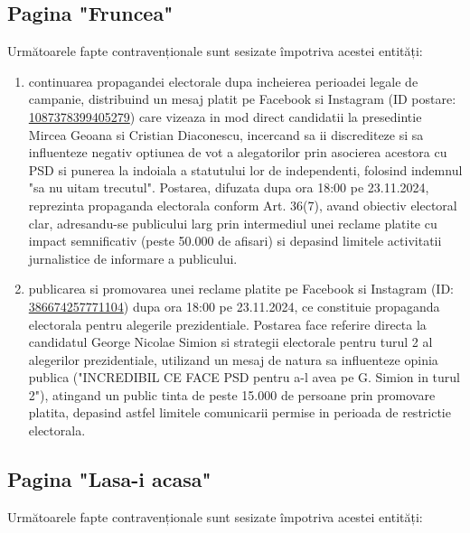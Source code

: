 \documentclass[a4paper,12pt]{article}
\begin{document}
\vspace{0.5cm}

\subsection{Pagina "Fruncea"}
Următoarele fapte contravenționale sunt sesizate împotriva acestei entități:

\begin{enumerate}[leftmargin=*, label=\arabic*.)]
    \item continuarea propagandei electorale dupa incheierea perioadei legale de campanie, distribuind un mesaj platit pe Facebook si Instagram (ID postare: \href{https://www.facebook.com/ads/library/?id=1087378399405279}{1087378399405279}) care vizeaza in mod direct candidatii la presedintie Mircea Geoana si Cristian Diaconescu, incercand sa ii discrediteze si sa influenteze negativ optiunea de vot a alegatorilor prin asocierea acestora cu PSD si punerea la indoiala a statutului lor de independenti, folosind indemnul "sa nu uitam trecutul". Postarea, difuzata dupa ora 18:00 pe 23.11.2024, reprezinta propaganda electorala conform Art. 36(7), avand obiectiv electoral clar, adresandu-se publicului larg prin intermediul unei reclame platite cu impact semnificativ (peste 50.000 de afisari) si depasind limitele activitatii jurnalistice de informare a publicului.
    \item publicarea si promovarea unei reclame platite pe Facebook si Instagram (ID: \href{https://www.facebook.com/ads/library/?id=386674257771104}{386674257771104}) dupa ora 18:00 pe 23.11.2024, ce constituie propaganda electorala pentru alegerile prezidentiale. Postarea face referire directa la candidatul George Nicolae Simion si strategii electorale pentru turul 2 al alegerilor prezidentiale, utilizand un mesaj de natura sa influenteze opinia publica ("INCREDIBIL CE FACE PSD pentru a-l avea pe G. Simion in turul 2"), atingand un public tinta de peste 15.000 de persoane prin promovare platita, depasind astfel limitele comunicarii permise in perioada de restrictie electorala.
\end{enumerate}

\vspace{0.5cm}

\subsection{Pagina "Lasa-i acasa"}
Următoarele fapte contravenționale sunt sesizate împotriva acestei entități:
\end{document}
